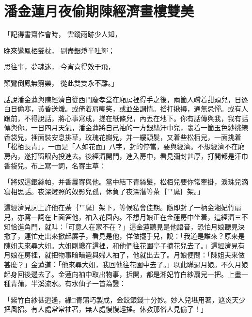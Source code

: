 %

\chapter{潘金蓮月夜偷期\KG 陳經濟畫樓雙美}


\begin{showcontents}{}



「記得書齋作會時，  雲蹤雨跡少人知，

晚來鸞鳳栖雙枕，  剔盡銀燈半吐輝；

思往事，夢魂迷，  今宵喜得效于飛，

顛鸞倒鳳無窮樂，  從此雙雙永不離。」

話說潘金蓮與陳經濟自從西門慶孝堂在廂房裡得手之後，兩箇人嚐着甜頭兒，日逐白日偷寒，黃昏送煖。或倚着肩嘲笑，或並坐調情。搯打揪撏，通無忌憚。或有人跟前，不得說話，將心事寫成，搓在紙條兒，內丟在地下。你有話傳與我，我有話傳與你。一日四月天氣，潘金蓮將自己袖的一方銀絲汗巾兒，裹着一箇玉色紗挑線香袋兒，裡面裝安息排草，玫瑰花瓣兒，并一縷頭髮，又着些松栢兒，一面挑着「松栢長青」，一面是「人如花面」八字，封的停當，要與經濟。不想經濟不在廂房內，遂打窗眼內投進去。後經濟開門，進入房中，看見彌封甚厚，打開都是汗巾香袋兒。布上寫一詞，名寄生草：

「將奴這銀絲帕，并香曩寄與他。當中結下青絲髮，松栢兒要你常牽掛，淚珠兒滴寫相思話。夜深燈照的奴影兒孤，休負了夜深潛等茶｛艹縻｝架。」

這經濟見詞上許他在荼｛艹縻｝架下，等候私會佳期。隨即封了一柄金湘妃竹扇兒，亦寫一詞在上面答他，袖入花園內。不想月娘正在金蓮房中坐着，這經濟三不知恰進角門，就叫：「可意人在家不在？」這金蓮聽見是他語音，恐怕月娘聽見決撒了，連忙走出來掀起簾子，看見是他，佯做擺手兒，說：「我道是誰來？原來是陳姐夫來尋大姐。大姐剛纔在這裡，和他們往花園亭子摘花兒去了。」這經濟見有月娘在房裡，就把物事暗暗遞與婦人袖了，他就出去了。月娘便問：「陳姐夫來做甚麼？」金蓮道：「他來尋大姐，我回他往花園中去了。」以此瞞過月娘。不久月娘起身回後邊去了。金蓮向袖中取出物事，拆開，都是湘妃竹白紗扇兒一把。上畫一種青蒲，半溪流水。有水仙子一首為證：

「紫竹白紗甚逍遙，綠□青蒲巧製成，金鉸銀錢十分妙。妙人兒堪用著，遮炎天少把風招。有人處常常袖著，無人處慢慢輕搖。休教那俗人見偷了！」


\end{showcontents}
